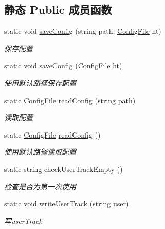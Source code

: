 \subsection*{静态 Public 成员函数}
\begin{DoxyCompactItemize}
\item 
static void \hyperlink{classcustom__cloud_1_1_my_config_a42abe4be759b1e4eb1cc0383ead50683}{save\+Config} (string path, \hyperlink{classcustom__cloud_1_1_my_config_1_1_config_file}{Config\+File} ht)
\begin{DoxyCompactList}\small\item\em 保存配置 \end{DoxyCompactList}\item 
static void \hyperlink{classcustom__cloud_1_1_my_config_a1a9c366b2cd58680c70870d19e412ebb}{save\+Config} (\hyperlink{classcustom__cloud_1_1_my_config_1_1_config_file}{Config\+File} ht)
\begin{DoxyCompactList}\small\item\em 使用默认路径保存配置 \end{DoxyCompactList}\item 
static \hyperlink{classcustom__cloud_1_1_my_config_1_1_config_file}{Config\+File} \hyperlink{classcustom__cloud_1_1_my_config_a2353b96c780635238ee19ba5d24f218e}{read\+Config} (string path)
\begin{DoxyCompactList}\small\item\em 读取配置 \end{DoxyCompactList}\item 
static \hyperlink{classcustom__cloud_1_1_my_config_1_1_config_file}{Config\+File} \hyperlink{classcustom__cloud_1_1_my_config_a4f795561b0573449254c7c3e1946ae1d}{read\+Config} ()
\begin{DoxyCompactList}\small\item\em 使用默认路径读取配置 \end{DoxyCompactList}\item 
static string \hyperlink{classcustom__cloud_1_1_my_config_ab1db143e47e208c0076e36d464b4d371}{check\+User\+Track\+Empty} ()
\begin{DoxyCompactList}\small\item\em 检查是否为第一次使用 \end{DoxyCompactList}\item 
static void \hyperlink{classcustom__cloud_1_1_my_config_a8fba2ec2a07051c75cde3f06e2f97fe0}{write\+User\+Track} (string user)
\begin{DoxyCompactList}\small\item\em 写user\+Track \end{DoxyCompactList}\item 

\end{DoxyCompactItemize}
